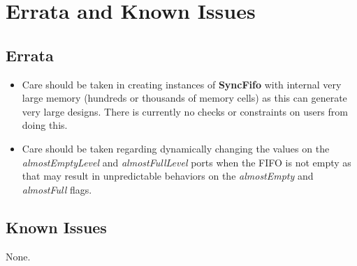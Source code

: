 \section{Errata and Known Issues}

\subsection{Errata}
\begin{itemize}
  \item{
        Care should be taken in creating instances of \textbf{SyncFifo}
        with internal very large memory (hundreds or thousands of memory
        cells) as this can generate very large designs. There is currently
        no checks or constraints on users from doing this.
        }

  \item{
        Care should be taken regarding dynamically changing the values on
        the \textit{almostEmptyLevel} and \textit{almostFullLevel} ports
        when the FIFO is not empty as that may result in unpredictable
        behaviors on the \textit{almostEmpty} and \textit{almostFull} flags.
        }
\end{itemize}

\subsection{Known Issues}
None.
